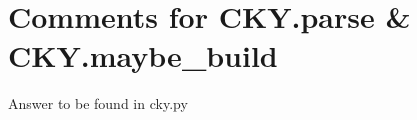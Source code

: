 \documentclass{article}
\begin{document}
\section{Comments for CKY.parse \& CKY.maybe\_build}
%	
%
%	   
%	
%	
%

Answer to be found in cky.py
\end{document}
